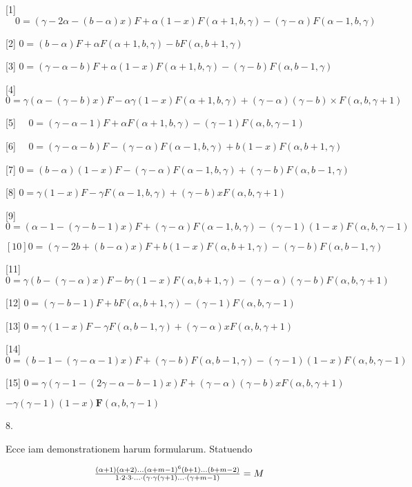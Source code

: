 \documentclass[twoside,12pt, showframe]{memoir}
\let\oldfrac\frac
\def\frac#1#2{\mathchoice{\tfrac{#1}{#2}}{\oldfrac{#1}{#2}}{\genfrac{}{}{}{2}{#1}{#2\mathstrut}}{\genfrac{}{}{}{3}{#1}{#2\mathstrut}}}
\begin{document}
[1] \(\quad 0=(\gamma-2 \alpha-(b-\alpha) x) F+\alpha(1-x) F(\alpha+1, b, \gamma)-(\gamma-\alpha) F(\alpha-1, b, \gamma)\)

[2] \(0=(b-\alpha) F+\alpha F(\alpha+1, b, \gamma)-b F(\alpha, b+1, \gamma)\)

[3] \(0=(\gamma-\alpha-b) F+\alpha(1-x) F(\alpha+1, b, \gamma)-(\gamma-b) F(\alpha, b-1, \gamma)\)

[4] \(0=\gamma(\alpha-(\gamma-b) x) F-\alpha \gamma(1-x) F(\alpha+1, b, \gamma)+(\gamma-\alpha)(\gamma-b) \times F(\alpha, b, \gamma+1)\)

[5] \(\quad 0=(\gamma-\alpha-1) F+\alpha F(\alpha+1, b, \gamma)-(\gamma-1) F(\alpha, b, \gamma-1)\)

[6] \(\quad 0=(\gamma-\alpha-b) F-(\gamma-\alpha) F(\alpha-1, b, \gamma)+b(1-x) F(\alpha, b+1, \gamma)\)

[7] \(0=(b-\alpha)(1-x) F-(\gamma-\alpha) F(\alpha-1, b, \gamma)+(\gamma-b) F(\alpha, b-1, \gamma)\)

[8] \(0=\gamma(1-x) F-\gamma F(\alpha-1, b, \gamma)+(\gamma-b) x F(\alpha, b, \gamma+1)\)

[9] \(0=(\alpha-1-(\gamma-b-1) x) F+(\gamma-\alpha) F(\alpha-1, b, \gamma)-(\gamma-1)(1-x) F(\alpha, b, \gamma-1)\)

\([10] 0=(\gamma-2 b+(b-\alpha) x) F+b(1-x) F(\alpha, b+1, \gamma)-(\gamma-b) F(\alpha, b-1, \gamma)\)

[11] \(0=\gamma(b-(\gamma-\alpha) x) F-b \gamma(1-x) F(\alpha, b+1, \gamma)-(\gamma-\alpha)(\gamma-b) F(\alpha, b, \gamma+1)\)

[12] \(0=(\gamma-b-1) F+b F(\alpha, b+1, \gamma)-(\gamma-1) F(\alpha, b, \gamma-1)\)

[13] \(0=\gamma(1-x) F-\gamma F(\alpha, b-1, \gamma)+(\gamma-\alpha) x F(\alpha, b, \gamma+1)\)

[14] \(0=(b-1-(\gamma-\alpha-1) x) F+(\gamma-b) F(\alpha, b-1, \gamma)-(\gamma-1)(1-x) F(\alpha, b, \gamma-1)\)

[15] \(0=\gamma(\gamma-1-(2 \gamma-\alpha-b-1) x) F+(\gamma-\alpha)(\gamma-b) x F(\alpha, b, \gamma+1)\)

\(-\gamma(\gamma-1)(1-x) \boldsymbol{F}(\alpha, b, \gamma-1)\)

8.

Ecce iam demonstrationem harum formularum. Statuendo

\[
\frac{(\alpha+1)(\alpha+2) \ldots(\alpha+m-1)^{6}(b+1) \ldots(b+m-2)}{1 \cdot 2 \cdot 3 \cdot \ldots \cdot(\gamma \cdot \gamma(\gamma+1) \ldots \cdot(\gamma+m-1)}=M
\]
\end{document}
